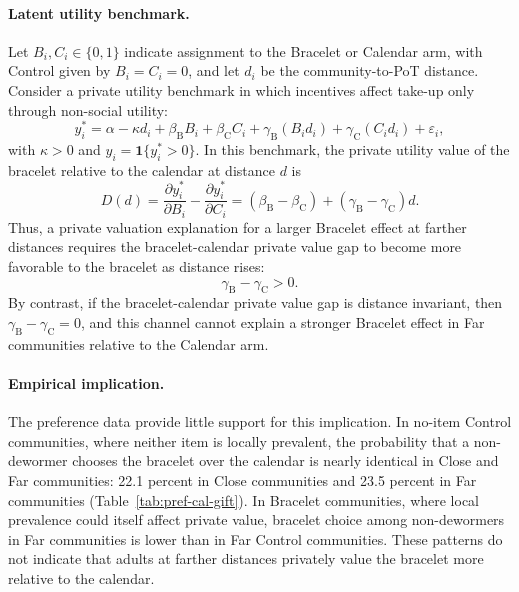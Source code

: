 \documentclass[ECM\space ReStud.tex]{subfiles}
\begin{document}
\paragraph{Latent utility benchmark.}
Let \(B_i,C_i\in\{0,1\}\) indicate assignment to the Bracelet or Calendar arm, with Control given by \(B_i=C_i=0\), and let \(d_i\) be the community-to-PoT distance. Consider a private utility benchmark in which incentives affect take-up only through non-social utility:
\begin{equation}
  y_i^{*}= \alpha
           -\kappa d_i
           +\beta_{\mathrm B} B_i
           +\beta_{\mathrm C} C_i
           +\gamma_{\mathrm B}(B_i d_i)
           +\gamma_{\mathrm C}(C_i d_i)
           +\varepsilon_i,
  \label{eq:latent-private}
\end{equation}
with \(\kappa>0\) and \(y_i=\mathbf 1\{y_i^{*}>0\}\). In this benchmark, the private utility value of the bracelet relative to the calendar at distance \(d\) is
\[
  D(d)
  =
  \frac{\partial y_i^{*}}{\partial B_i}
  -
  \frac{\partial y_i^{*}}{\partial C_i}
  =
  (\beta_{\mathrm B}-\beta_{\mathrm C})
  +
  (\gamma_{\mathrm B}-\gamma_{\mathrm C})d.
\]
Thus, a private valuation explanation for a larger Bracelet effect at farther distances requires the bracelet-calendar private value gap to become more favorable to the bracelet as distance rises:
\[
  \gamma_{\mathrm B}-\gamma_{\mathrm C}>0.
\]
By contrast, if the bracelet-calendar private value gap is distance invariant, then \(\gamma_{\mathrm B}-\gamma_{\mathrm C}=0\), and this channel cannot explain a stronger Bracelet effect in Far communities relative to the Calendar arm.

\paragraph{Empirical implication.}
The preference data provide little support for this implication. In no-item Control communities, where neither item is locally prevalent, the probability that a non-dewormer chooses the bracelet over the calendar is nearly identical in Close and Far communities: 22.1 percent in Close communities and 23.5 percent in Far communities (Table~\ref{tab:pref-cal-gift}). In Bracelet communities, where local prevalence could itself affect private value, bracelet choice among non-dewormers in Far communities is lower than in Far Control communities. These patterns do not indicate that adults at farther distances privately value the bracelet more relative to the calendar.
\end{document}
